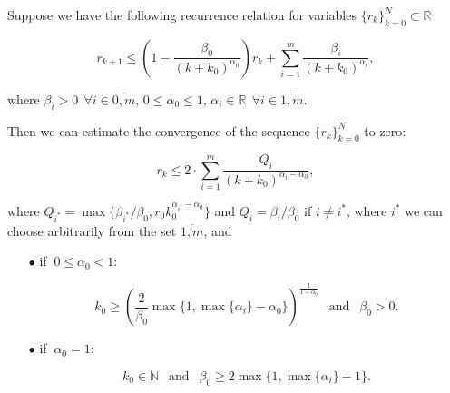     \begin{lemma}
    \label{lem:recursion}
    Suppose we have the following recurrence relation for variables $\{r_k\}_{k=0}^N \subset \mathbb{R}$

    \begin{equation}
    \label{eq:recur_start}
        r_{k+1} \leq \left(1 - \frac{\beta_0}{(k + k_0)^{\alpha_0}}\right) r_{k} + \sum\limits_{i = 1}^m \frac{\beta_i}{(k + k_0)^{\alpha_i}},
    \end{equation}

    where $\beta_i > 0 ~~ \forall i \in \overline{0, m}$, $0 \leq \alpha_0 \leq 1$, $\alpha_i \in \mathbb{R} ~~ \forall i \in \overline{1, m}$. 
    
    Then we can estimate the convergence of the sequence $\{r_k\}_{k=0}^N$ to zero:

    \begin{equation}
    \label{eq:recur_end}
        r_k \leq 2 \cdot \sum\limits_{i = 1}^m \frac{Q_i}{(k+k_0)^{\alpha_i - \alpha_0}},
    \end{equation}

    where $Q_{i^*} = \max\{\beta_{i^*} / \beta_0, r_0 k_0^{\alpha_{i^*} - \alpha_0}\}$ and $Q_i = \beta_i / \beta_0$ if $i \neq i^*$, where $i^*$ we can choose arbitrarily from the set $\overline{1, m}$, and

    \begin{enumerate}
        \item[$\bullet$] if $~0 \leq \alpha_0 < 1$:

        \begin{equation*}
            k_0 \geq \left( \frac{2}{\beta_0} \max\{1, \max\{\alpha_i\} - \alpha_0\} \right)^{\frac{1}{1 - \alpha_0}} ~~ \text{ and } ~~ \beta_0 > 0.
        \end{equation*}

        \item[$\bullet$] if $~\alpha_0 = 1$:

        \begin{equation*}
            k_0 \in \mathbb{N} ~~\text{ and }~~ \beta_0 \geq 2 \max\{1, \max\{\alpha_i\} - 1\}.
        \end{equation*}
    \end{enumerate}
        
    \end{lemma}
